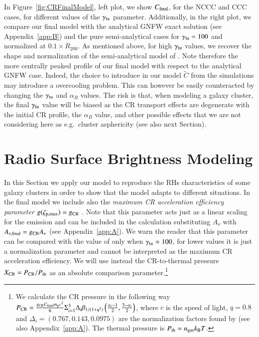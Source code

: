 \documentclass[traditabstract]{aa}
\begin{document}
In Figure~\ref{fig:CRFinalModel}, left plot, we show $C_{\rm{final}}$, for the NCCC and CCC cases, for different values of the $\gamma_{\rm{tu}}$ parameter. Additionally, in the right plot, we compare our final model with the analytical GNFW exact solution (see Appendix~\ref{app:B}) and the pure semi-analytical cases for $\gamma_{\rm{tu}}=100$ and normalized at $0.1 \times R_{200}$. As mentioned above, for high $\gamma_{\rm{tu}}$ values, we recover the shape and normalization of the semi-analytical model of \cite{2010MNRAS.409..449P}. Note therefore the more centrally peaked profile of our final model with respect to the analytical GNFW case. Indeed, the choice to introduce in our model $\tilde{C}$ from the \cite{2010MNRAS.409..449P} simulations may introduce a overcooling problem. This can however be easily counteracted by changing the $\gamma_{\rm{tu}}$ and $\alpha_B$ values. The risk is that, when modeling a galaxy cluster, the final $\gamma_{\rm{tu}}$ value will be biased as the CR transport effects are degenerate with the initial CR profile, the $\alpha_B$ value, and other possible effects that we are not considering here as e.g.~cluster asphericity (see also next Section).


\section{Radio Surface Brightness Modeling}
\label{sec:3}
In this Section we apply our model to reproduce the RHs characteristics of some galaxy clusters in order to show that the model adapts to different situations. In the final model we include also the \emph{maximum CR acceleration efficiency parameter} $g(\zeta_{\rm{p,max}})=g_{\rm{CR}}$ \citep{2010MNRAS.409..449P}. Note that this parameter acts just as a linear scaling for the emission and can be included in the calculation substituting $A_{\nu}$ with $A_{\nu,\rm{final}}=g_{\rm{CR}}A_{\nu}$ (see Appendix~\ref{app:A}). We warn the reader that this parameter can be compared with the value of \cite{2010MNRAS.409..449P} only when $\gamma_{\rm{tu}}\approx100$, for lower values it is just a normalization parameter and cannot be interpreted as the maximum CR acceleration efficiency. We will use instead the CR-to-thermal pressure  $X_{\rm{CR}}=P_{\rm{CR}}/P_{\rm{th}}$ as an absolute comparison parameter.\footnote[11]{We calculate the CR pressure in the following way $P_{\rm{CR}}=\frac{g_{\rm{CR}} C_{\rm{final}} m_{\rm{p}} c^{2}}{6} \Sigma_{i=1}^{3} \Delta_{i} \beta_{1/(1+q^2)}  \left( \frac{\alpha_{i}-1}{2},\frac{3-\alpha_{i}}{2} \right)$, where $c$ is the speed of light, $q=0.8$ \citep{2010MNRAS.409..449P} and $\Delta_{i} = (0.767, 0.143, 0.0975)$ are the normalization factors found by \cite{2010MNRAS.409..449P} (see also Appendix~\ref{app:A}). The thermal pressure is $P_{\rm{th}}=n_{\rm{gas}}k_{\rm{B}}T$.} 
\end{document}
